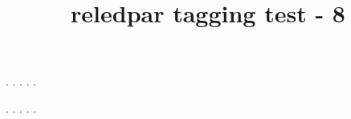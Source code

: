 \documentclass[a5paper,11pt]{article}
\title{reledpar tagging test - 8}
\begin{document}
\begin{pages}
    \begin{Leftside}
        \beginnumbering
            . \blindtext[21]
            \pend{}. \blindtext[10]
            \pend{}. \blindtext[6]
            \pend{}. \blindtext[6]
            \pend
            . \blindtext[6]
            \pend
        \endnumbering
    \end{Leftside}
    \begin{Rightside}
        \beginnumbering
            . \blindtext[22]\footnoteAmk
            \pend{}. \blindtext[12]
            \pend{}. \blindtext[12]
            \pend
            . \blindtext[12]
            \pend
            . \blindtext[12]
            \pend
        \endnumbering
    \end{Rightside}
\end{pages}
\Pages
\end{document}
